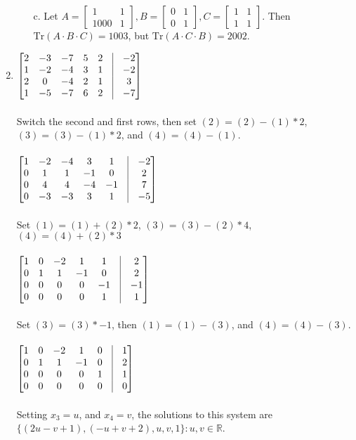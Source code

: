 \documentclass[10pt,english]{article}
\begin{document}
\begin{enumerate}
\begin{enumerate}
\item [c.] Let $A=\begin{bmatrix}1&1\\1000&1\end{bmatrix}, B=\begin{bmatrix}0&1\\0&1\end{bmatrix}, C=\begin{bmatrix}1&1\\1&1\end{bmatrix}$. Then $\text{Tr}(A\cdot B\cdot C) = 1003$, but $\text{Tr}(A\cdot C\cdot B) = 2002$. 
\end{enumerate}

\pagebreak
\item 
$\begin{bmatrix}
2 & -3 & -7 & 5 & 2 & \vrule & -2 \\ 
1 & -2 & -4 & 3 & 1 & \vrule & -2 \\ 
2 & 0 & -4 & 2 & 1 & \vrule & 3 \\ 
1 & -5 & -7 & 6 & 2 & \vrule & -7
\end{bmatrix}$\\\\ 
Switch the second and first rows, then set $(2)=(2)-(1)*2$, $(3)=(3)-(1)*2$, and $(4)=(4)-(1)$.\\   \\
$\begin{bmatrix}
1 & -2 & -4 & 3 & 1 & \vrule & -2 \\ 
0 & 1 & 1 & -1 & 0 & \vrule & 2 \\ 
0 & 4 & 4 & -4 & -1 & \vrule & 7 \\ 
0 & -3 & -3 & 3 & 1 & \vrule & -5
\end{bmatrix}$\\ \\ 
Set $(1)=(1)+(2)*2$, $(3)=(3)-(2)*4$, $(4)=(4)+(2)*3$ \\\\ 
$\begin{bmatrix}
1 & 0 & -2 & 1 & 1 & \vrule & 2 \\ 
0 & 1 & 1 & -1 & 0 & \vrule & 2 \\ 
0 & 0 & 0 & 0 & -1 & \vrule & -1 \\ 
0 & 0 & 0 & 0 & 1 & \vrule & 1 
\end{bmatrix}$\\ \\ 
Set $(3)=(3)*-1$, then $(1)=(1)-(3)$, and $(4)=(4)-(3)$. \\ \\
$\begin{bmatrix}
1 & 0 & -2 & 1 & 0 & \vrule & 1 \\ 
0 & 1 & 1 & -1 & 0 & \vrule & 2 \\ 
0 & 0 & 0 & 0 & 1 & \vrule & 1 \\ 
0 & 0 & 0 & 0 & 0 & \vrule & 0
\end{bmatrix}$ \\ \\ 
Setting $x_3=u$, and $x_4=v$, the solutions to this system are $\{(2u-v+1),(-u+v+2),u,v,1\}:u,v\in\mathbb{R}$. 


\end{enumerate}
\end{document}
